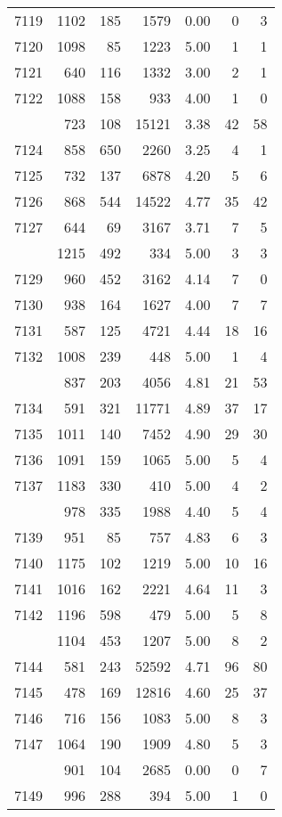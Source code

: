 \documentclass[
]{article}
\begin{document}
\begin{table}
\begin{tabular}[t]{lrrrrrr}
7119 & 1102 & 185 & 1579 & 0.00 & 0 & 3\\
7120 & 1098 & 85 & 1223 & 5.00 & 1 & 1\\
7121 & 640 & 116 & 1332 & 3.00 & 2 & 1\\
7122 & 1088 & 158 & 933 & 4.00 & 1 & 0\\
\addlinespace
7123 & 723 & 108 & 15121 & 3.38 & 42 & 58\\
7124 & 858 & 650 & 2260 & 3.25 & 4 & 1\\
7125 & 732 & 137 & 6878 & 4.20 & 5 & 6\\
7126 & 868 & 544 & 14522 & 4.77 & 35 & 42\\
7127 & 644 & 69 & 3167 & 3.71 & 7 & 5\\
\addlinespace
7128 & 1215 & 492 & 334 & 5.00 & 3 & 3\\
7129 & 960 & 452 & 3162 & 4.14 & 7 & 0\\
7130 & 938 & 164 & 1627 & 4.00 & 7 & 7\\
7131 & 587 & 125 & 4721 & 4.44 & 18 & 16\\
7132 & 1008 & 239 & 448 & 5.00 & 1 & 4\\
\addlinespace
7133 & 837 & 203 & 4056 & 4.81 & 21 & 53\\
7134 & 591 & 321 & 11771 & 4.89 & 37 & 17\\
7135 & 1011 & 140 & 7452 & 4.90 & 29 & 30\\
7136 & 1091 & 159 & 1065 & 5.00 & 5 & 4\\
7137 & 1183 & 330 & 410 & 5.00 & 4 & 2\\
\addlinespace
7138 & 978 & 335 & 1988 & 4.40 & 5 & 4\\
7139 & 951 & 85 & 757 & 4.83 & 6 & 3\\
7140 & 1175 & 102 & 1219 & 5.00 & 10 & 16\\
7141 & 1016 & 162 & 2221 & 4.64 & 11 & 3\\
7142 & 1196 & 598 & 479 & 5.00 & 5 & 8\\
\addlinespace
7143 & 1104 & 453 & 1207 & 5.00 & 8 & 2\\
7144 & 581 & 243 & 52592 & 4.71 & 96 & 80\\
7145 & 478 & 169 & 12816 & 4.60 & 25 & 37\\
7146 & 716 & 156 & 1083 & 5.00 & 8 & 3\\
7147 & 1064 & 190 & 1909 & 4.80 & 5 & 3\\
\addlinespace
7148 & 901 & 104 & 2685 & 0.00 & 0 & 7\\
7149 & 996 & 288 & 394 & 5.00 & 1 & 0\\

\end{tabular}
\end{table}
\end{document}
